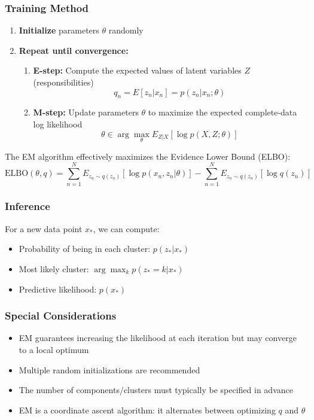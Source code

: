 \documentclass{article}
\begin{document}
\subsubsection{Training Method}
\begin{enumerate}
    \item \textbf{Initialize} parameters $\theta$ randomly
    \item \textbf{Repeat until convergence:}
    \begin{enumerate}
        \item \textbf{E-step:} Compute the expected values of latent variables $Z$ (responsibilities)
        \begin{equation}
            q_n = E[z_n|x_n] = p(z_n|x_n; \theta)
        \end{equation}
        
        \item \textbf{M-step:} Update parameters $\theta$ to maximize the expected complete-data log likelihood
        \begin{equation}
            \theta \in \arg\max_{\theta} E_{Z|X}[\log p(X, Z; \theta)]
        \end{equation}
    \end{enumerate}
\end{enumerate}

The EM algorithm effectively maximizes the Evidence Lower Bound (ELBO):
\begin{equation}
    \text{ELBO}(\theta, q) = \sum_{n=1}^N E_{z_n\sim q(z_n)}[\log p(x_n, z_n|\theta)] - \sum_{n=1}^N E_{z_n\sim q(z_n)}[\log q(z_n)]
\end{equation}

\subsubsection{Inference}
For a new data point $x_*$, we can compute:
\begin{itemize}
    \item Probability of being in each cluster: $p(z_*|x_*)$
    \item Most likely cluster: $\arg\max_k p(z_*=k|x_*)$
    \item Predictive likelihood: $p(x_*)$
\end{itemize}

\subsubsection{Special Considerations}
\begin{itemize}
    \item EM guarantees increasing the likelihood at each iteration but may converge to a local optimum
    \item Multiple random initializations are recommended
    \item The number of components/clusters must typically be specified in advance
    \item EM is a coordinate ascent algorithm: it alternates between optimizing $q$ and $\theta$
\end{itemize}
\end{document}
